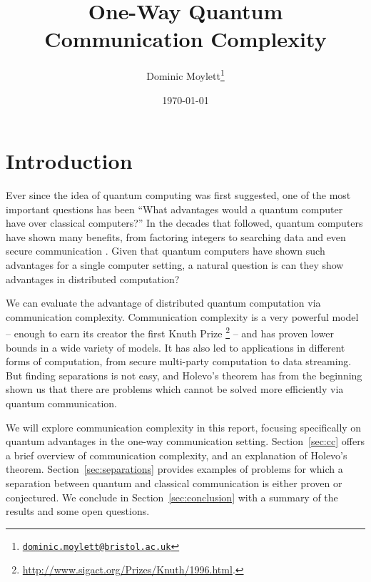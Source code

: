 \documentclass[a4paper]{article}
\begin{document}
    \title{One-Way Quantum Communication Complexity}
    \author{Dominic Moylett\thanks{\texttt{\href{dominic.moylett@bristol.ac.uk}{dominic.moylett@bristol.ac.uk}}}}
    \date{\today}
    \maketitle

    \section{Introduction}

        Ever since the idea of quantum computing was first suggested, one of the most important questions has been ``What advantages would a quantum computer have over classical computers?'' In the decades that followed, quantum computers have shown many benefits, from factoring integers \cite{Shor:1997:PAP:264393.264406} to searching data \cite{Grover:1996:FQM:237814.237866} and even secure communication \cite{Bennett20147}. Given that quantum computers have shown such advantages for a single computer setting, a natural question is can they show advantages in distributed computation?

        We can evaluate the advantage of distributed quantum computation via communication complexity. Communication complexity is a very powerful model -- enough to earn its creator the first Knuth Prize \footnote{\url{http://www.sigact.org/Prizes/Knuth/1996.html}.} -- and has proven lower bounds in a wide variety of models. It has also led to applications in different forms of computation, from secure multi-party computation to data streaming. But finding separations is not easy, and Holevo's theorem has from the beginning shown us that there are problems which cannot be solved more efficiently via quantum communication.

        We will explore communication complexity in this report, focusing specifically on quantum advantages in the one-way communication setting. Section~\ref{sec:cc} offers a brief overview of communication complexity, and an explanation of Holevo's theorem. Section~\ref{sec:separations} provides examples of problems for which a separation between quantum and classical communication is either proven or conjectured. We conclude in Section~\ref{sec:conclusion} with a summary of the results and some open questions.
\end{document}
